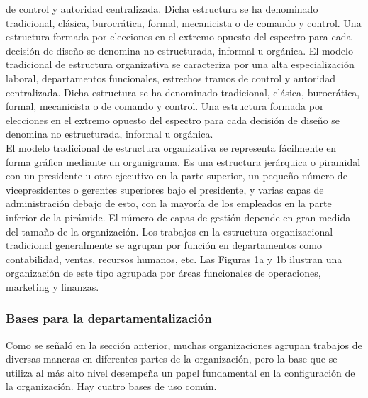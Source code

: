 \documentclass[10pt]{book}
\begin{document}
de control y autoridad centralizada. Dicha estructura se ha denominado tradicional, clásica, burocrática, formal, mecanicista o de comando y control. Una estructura formada por elecciones en el extremo opuesto del espectro para cada decisión de diseño se denomina no estructurada, informal u orgánica. El modelo tradicional de estructura organizativa se caracteriza por una alta especialización laboral, departamentos funcionales, estrechos tramos de control y autoridad centralizada. Dicha estructura se ha denominado tradicional, clásica, burocrática, formal, mecanicista o de comando y control. Una estructura formada por elecciones en el extremo opuesto del espectro para cada decisión de diseño se denomina no estructurada, informal u orgánica.\\
El modelo tradicional de estructura organizativa se representa fácilmente en forma gráfica mediante un organigrama. Es una estructura jerárquica o piramidal con un presidente u otro ejecutivo en la parte superior, un pequeño número de vicepresidentes o gerentes superiores bajo el presidente, y varias capas de administración debajo de esto, con la mayoría de los empleados en la parte inferior de la pirámide. El número de capas de gestión depende en gran medida del tamaño de la organización. Los trabajos en la estructura organizacional tradicional generalmente se agrupan por función en departamentos como contabilidad, ventas, recursos humanos, etc. Las Figuras 1a y 1b ilustran una organización de este tipo agrupada por áreas funcionales de operaciones, marketing y finanzas.
\subsubsection{Bases para la departamentalización}
Como se señaló en la sección anterior, muchas organizaciones agrupan trabajos de diversas maneras en diferentes partes de la organización, pero la base que se utiliza al más alto nivel desempeña un papel fundamental en la configuración de la organización. Hay cuatro bases de uso común.
\end{document}
